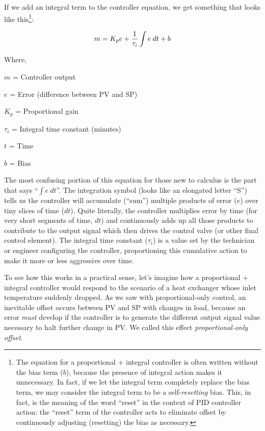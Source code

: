 If we add an integral term to the controller equation, we get something that looks like this\footnote{The equation for a proportional + integral controller is often written without the bias term ($b$), because the presence of integral action makes it unnecessary.  In fact, if we let the integral term completely replace the bias term, we may consider the integral term to be a self-\textit{resetting} bias.  This, in fact, is the meaning of the word ``reset'' in the context of PID controller action: the ``reset'' term of the controller acts to eliminate offset by continuously adjusting (resetting) the bias as necessary.}:

$$m = K_p e + {1 \over \tau_i} \int e \> dt + b$$

\noindent
Where,

$m$ = Controller output

$e$ = Error (difference between PV and SP)

$K_p$ = Proportional gain

$\tau_i$ = Integral time constant (minutes)

$t$ = Time

$b$ = Bias

\vskip 10pt

The most confusing portion of this equation for those new to calculus is the part that says ``$\int e \> dt$''.  The integration symbol (looks like an elongated letter ``S'') tells us the controller will accumulate (``sum'') multiple products of error ($e$) over tiny slices of time ($dt$).  Quite literally, the controller multiplies error by time (for very short segments of time, $dt$) and continuously adds up all those products to contribute to the output signal which then drives the control valve (or other final control element).  The integral time constant ($\tau_i$) is a value set by the technician or engineer configuring the controller, proportioning this cumulative action to make it more or less aggressive over time.

\vskip 10pt

To see how this works in a practical sense, let's imagine how a proportional + integral controller would respond to the scenario of a heat exchanger whose inlet temperature suddenly dropped.  As we saw with proportional-only control, an inevitable offset occurs between PV and SP with changes in load, because an error \textit{must} develop if the controller is to generate the different output signal value necessary to halt further change in PV.  We called this effect \textit{proportional-only offset}.   

